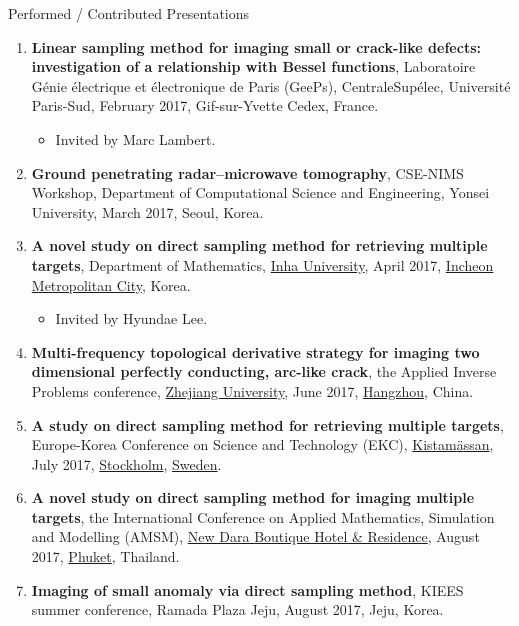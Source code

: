 \documentclass{resume} %
\begin{document}
\begin{rSection}{Performed / Contributed Presentations}
\begin{enumerate}
\item\label{P-SUPELEC2017} \textbf{Linear sampling method for imaging small or crack-like defects: investigation of a relationship with Bessel functions}, Laboratoire G{\'e}nie {\'e}lectrique et {\'e}lectronique de Paris (GeePs), CentraleSup{\'e}lec, Universit{\'e} Paris-Sud, February 2017, Gif-sur-Yvette Cedex, France.
\begin{itemize}
\item Invited by Marc Lambert.
\end{itemize}
\item\label{P-CSE2017A} \textbf{Ground penetrating radar--microwave tomography},  CSE-NIMS Workshop, Department of Computational Science and Engineering, Yonsei University, March 2017, Seoul, Korea.
\item\label{P-INHA2017} \textbf{A novel study on direct sampling method for retrieving multiple targets}, Department of Mathematics, \href{https://eng.inha.ac.kr/eng/index.do}{Inha University}, April 2017, \href{https://www.incheon.go.kr/en/index}{Incheon Metropolitan City}, Korea.
\begin{itemize}
\item Invited by Hyundae Lee.
\end{itemize}
\item\label{P-AIP2017} \textbf{Multi-frequency topological derivative strategy for imaging two dimensional perfectly conducting, arc-like crack}, the  Applied Inverse Problems conference, \href{http://www.zju.edu.cn/english/}{Zhejiang University}, June 2017, \href{http://www.hangzhou.gov.cn/}{Hangzhou}, China.
\item\label{P-EKC2017} \textbf{A study on direct sampling method for retrieving multiple targets}, Europe-Korea Conference on Science and Technology (EKC), \href{http://www.kistamassan.se/en}{Kistam{\"a}ssan}, July 2017, \href{https://www.visitstockholm.com}{Stockholm}, \href{https://sweden.se}{Sweden}.
\item\label{P-AMSM2017} \textbf{A novel study on direct sampling method for imaging multiple targets}, the  International Conference on Applied Mathematics, Simulation and Modelling (AMSM), \href{http://www.daraphuket.com/}{New Dara Boutique Hotel \& Residence}, August 2017, \href{https://www.tourismthailand.org/Destinations/Provinces/Phuket/350}{Phuket}, Thailand.
\item\label{P-KIEES2017A} \textbf{Imaging of small anomaly via direct sampling method}, KIEES summer conference, Ramada Plaza Jeju, August 2017, Jeju, Korea.

\end{enumerate}
\end{rSection}
\end{document}
